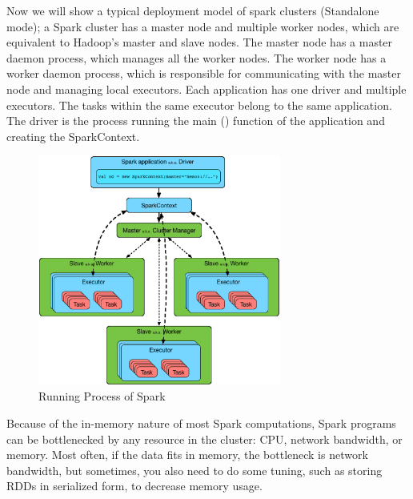 \par Now we will show a typical deployment model of spark clusters (Standalone mode); a Spark cluster has a master node and multiple worker nodes, which are equivalent to Hadoop's master and slave nodes. The master node has a master daemon process, which manages all the worker nodes. The worker node has a worker daemon process, which is responsible for communicating with the master node and managing local
executors. Each application has one driver and multiple executors. The tasks within the same executor belong to the same application. The driver is the process running the main () function of the application and creating the SparkContext.
\begin{figure}
	\includegraphics[width=8cm]{4.eps}
	\caption{Running Process of Spark}\label{fig:RunningSpark}
\end{figure}

\par Because of the in-memory nature of most Spark computations, Spark programs can be bottlenecked by any resource in the cluster: CPU, network bandwidth, or memory. Most often, if the data fits in memory, the bottleneck is network bandwidth, but sometimes, you also need to do some tuning, such as storing RDDs in serialized form, to decrease memory usage. 

